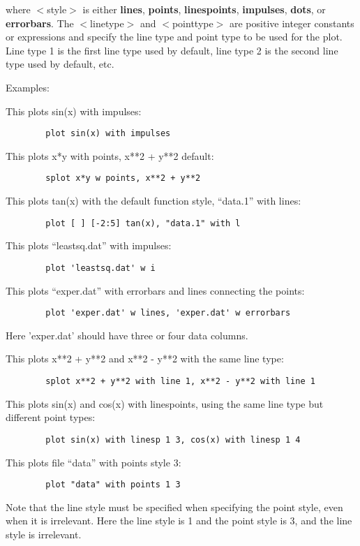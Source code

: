 where $<$style$>$ is either {\bf lines}, {\bf points}, {\bf linespoints}, {\bf impulses},
{\bf dots}, or {\bf errorbars}. The $<$linetype$>$ and $<$pointtype$>$ are positive
integer constants or expressions and specify the line type and point
type to be used for the plot. Line type 1 is the first line type used
by default, line type 2 is the second line type used by default, etc.

Examples:

This plots sin(x) with impulses:
\begin{verbatim}
        plot sin(x) with impulses
\end{verbatim}

This plots x*y with points, x**2 + y**2 default:
\begin{verbatim}
        splot x*y w points, x**2 + y**2
\end{verbatim}

This plots tan(x) with the default function style, ``data.1'' with lines:
\begin{verbatim}
        plot [ ] [-2:5] tan(x), "data.1" with l
\end{verbatim}

This plots ``leastsq.dat'' with impulses:
\begin{verbatim}
        plot 'leastsq.dat' w i
\end{verbatim}

This plots ``exper.dat'' with errorbars and lines connecting the points:
\begin{verbatim}
        plot 'exper.dat' w lines, 'exper.dat' w errorbars
\end{verbatim}
Here 'exper.dat' should have three or four data columns.

This plots x**2 + y**2 and x**2 - y**2 with the same line type:
\begin{verbatim}
        splot x**2 + y**2 with line 1, x**2 - y**2 with line 1
\end{verbatim}

This plots sin(x) and cos(x) with linespoints, using the
same line type but different point types:
\begin{verbatim}
        plot sin(x) with linesp 1 3, cos(x) with linesp 1 4
\end{verbatim}

This plots file ``data'' with points style 3:
\begin{verbatim}
        plot "data" with points 1 3 
\end{verbatim}
Note that the line style must be specified when specifying the point
style, even when it is irrelevant. Here the line style is 1 and the
point style is 3, and the line style is irrelevant.

